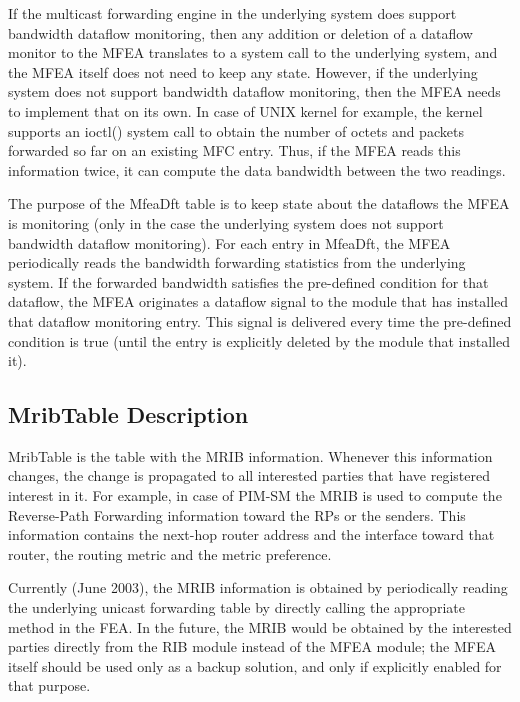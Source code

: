 \documentclass[11pt]{article}
\begin{document}
If the multicast forwarding engine in the underlying system does
support bandwidth dataflow monitoring, then any addition or
deletion of a dataflow monitor to the MFEA translates to a system call
to the underlying system, and the MFEA itself does not need to keep any
state. However, if the underlying system does not support bandwidth
dataflow monitoring, then the MFEA needs to implement that on its own.
In case of UNIX kernel for example, the kernel supports an ioctl()
system call to obtain the number of octets and packets forwarded so far on
an existing MFC entry. Thus, if the MFEA reads this information twice,
it can compute the data bandwidth between the two readings.

The purpose of the MfeaDft table is to keep state about the dataflows the
MFEA is monitoring (only in the case the underlying
system does not support bandwidth dataflow monitoring). For each entry
in MfeaDft, the MFEA periodically reads the bandwidth forwarding
statistics from the underlying system. If the forwarded bandwidth
satisfies the pre-defined condition for that dataflow, the MFEA
originates a dataflow signal to the module that has installed that
dataflow monitoring entry. This signal is delivered every time the
pre-defined condition is true (until the entry is explicitly deleted by
the module that installed it).

\subsection{MribTable Description}

MribTable is the table with the MRIB information. Whenever this
information changes, the change is propagated to all interested
parties that have registered interest in it. For example, in
case of PIM-SM the MRIB is used to compute the Reverse-Path Forwarding
information toward the RPs or the senders. This information contains the
next-hop router address and the interface toward that router, the
routing metric and the metric preference.

Currently (June 2003), the MRIB information is obtained by
periodically reading the underlying unicast forwarding table by directly
calling the appropriate method in the FEA. In the
future, the MRIB would be obtained by the interested parties directly
from the RIB module instead of the MFEA module; the MFEA itself should
be used only as a backup solution, and only if explicitly enabled for
that purpose.
\end{document}
